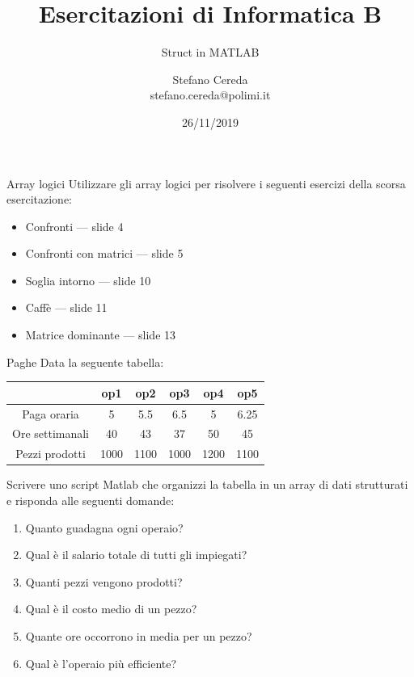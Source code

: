 \documentclass[aspectratio=169, handout]{beamer}
\title{Esercitazioni di Informatica B}
\subtitle{Struct in MATLAB}
\author{Stefano Cereda\\
stefano.cereda@polimi.it
}
\date{26/11/2019}
\institute[PoliMi]{Politecnico Milano}
\begin{document}
\begin{frame}
    \maketitle
\end{frame}

\begin{frame}{Array logici}
    Utilizzare gli array logici per risolvere i seguenti esercizi della scorsa esercitazione:
    \begin{itemize}
        \item Confronti --- slide 4
        \item Confronti con matrici --- slide 5
        \item Soglia intorno --- slide 10
        \item Caffè --- slide 11
        \item Matrice dominante --- slide 13
    \end{itemize}
\end{frame}

\begin{frame}{Paghe}
    Data la seguente tabella:

    \begin{tabular}{|c|c|c|c|c|c|}
        \hline
        & op1 & op2 & op3 & op4 & op5 \\
        \hline
        Paga oraria & 5 & 5.5 & 6.5 & 5 & 6.25 \\
        \hline
        Ore settimanali & 40 & 43 & 37 & 50 & 45 \\
        \hline
        Pezzi prodotti & 1000 & 1100 & 1000 & 1200 & 1100 \\
        \hline
    \end{tabular}

    Scrivere uno script Matlab che organizzi la tabella in un array di dati strutturati e risponda alle seguenti domande:
    \begin{enumerate}
        \item Quanto guadagna ogni operaio?
        \item Qual è il salario totale di tutti gli impiegati?
        \item Quanti pezzi vengono prodotti?
        \item Qual è il costo medio di un pezzo?
        \item Quante ore occorrono in media per un pezzo?
        \item Qual è l’operaio più efficiente?
    \end{enumerate}
\end{frame}
\end{document}
